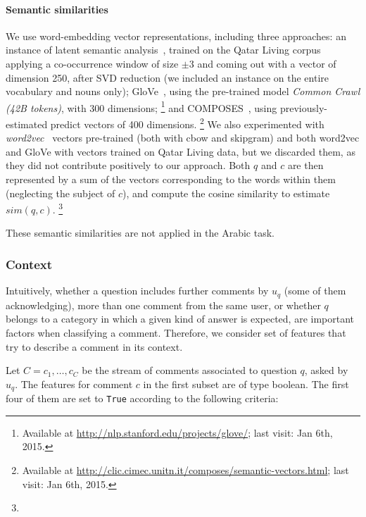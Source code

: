\paragraph{Semantic similarities}
\label{ssub:semantic}

We use word-embedding vector representations, including three approaches:
\Ni an instance of latent semantic analysis~\cite{croce-previtali:2010:GEMS}, 
trained on the Qatar Living corpus applying a co-occurrence window of size 
$\pm3$ and coming out with a vector of dimension 250, after SVD reduction (we 
included an instance on the entire vocabulary and nouns only);
\Nii GloVe~\cite{Pennington:2014}, using the pre-trained model \textit{Common 
Crawl (42B tokens)}, with 300 dimensions;%
\footnote{Available at \url{http://nlp.stanford.edu/projects/glove/}; last 
visit: Jan 6th, 2015.}
and \Niii COMPOSES~\cite{Baroni:2014}, using previously-estimated predict 
vectors of 400 dimensions.%
\footnote{Available at 
\url{http://clic.cimec.unitn.it/composes/semantic-vectors.html}; last visit: Jan 
6th, 2015.}
We also experimented with \textit{word2vec}~\cite{Mikolov:2013} 
vectors pre-trained (both with cbow and skipgram) and both word2vec and GloVe 
with vectors trained on Qatar Living data, but we discarded them, as they did 
not contribute positively to our approach.
Both $q$ and $c$ are then represented by a sum of the vectors 
corresponding to the words within them (neglecting the subject of $c$), and 
compute the cosine similarity to estimate $sim(q,c)$. 
\footnote{}

These semantic similarities are not applied in the Arabic task.

\subsubsection{Context }
\label{ssub:context}

Intuitively, whether a question includes further comments by $u_q$ (some of 
them acknowledging), more than one comment from the same user, or whether $q$ 
belongs to a category in which a given kind of answer is expected, are important 
factors when classifying a comment. Therefore, we consider set of features that 
try to describe a comment in its context.   

Let $C={c_1, \ldots,c_C}$ be the stream of comments associated to question $q$, 
asked by $u_q$. The features for comment $c$ in the first subset are of type 
boolean. The first four of them are set to \texttt{True} according to the 
following criteria:

